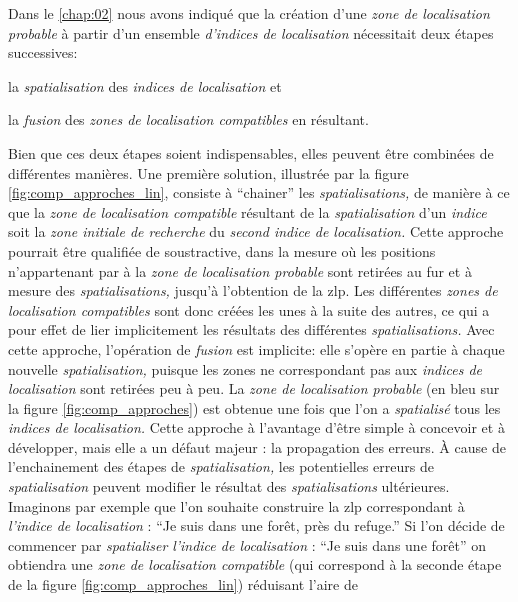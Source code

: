 Dans le \autoref{chap:02} nous avons indiqué que la création d'une
\emph{zone de localisation probable} à partir d'un ensemble
\emph{d'indices de localisation} nécessitait deux étapes successives:
% 
\begin{enumerate*}[label=(\alph*)]
\item la \emph{spatialisation} des \emph{indices de localisation} et
\item la \emph{fusion} des \emph{zones de localisation compatibles} en
résultant.
\end{enumerate*}
% 
Bien que ces deux étapes soient indispensables, elles peuvent être
combinées de différentes manières. Une première solution, illustrée
par la figure \ref{fig:comp_approches_lin}, consiste à
\enquote{chainer} les \emph{spatialisations,} de manière à ce que la
\emph{zone de localisation compatible} résultant de la
\emph{spatialisation} d'un \emph{indice} soit la \emph{zone initiale
  de recherche} du \emph{second indice de localisation.} Cette
approche pourrait être qualifiée de soustractive, dans la mesure où
les positions n'appartenant par à la \emph{zone de localisation
  probable} sont retirées au fur et à mesure des
\emph{spatialisations,} jusqu'à l'obtention de la \ac{zlp}. Les
différentes \emph{zones de localisation compatibles} sont donc créées
les unes à la suite des autres, ce qui a pour effet de lier
implicitement les résultats des différentes \emph{spatialisations.}
Avec cette approche, l'opération de \emph{fusion} est implicite: elle
s'opère en partie à chaque nouvelle \emph{spatialisation,} puisque les
zones ne correspondant pas aux \emph{indices de localisation} sont
retirées peu à peu. La \emph{zone de localisation probable} (en bleu
sur la figure \ref{fig:comp_approches}) est obtenue une fois que l'on
a \emph{spatialisé} tous les \emph{indices de localisation.} Cette
approche à l'avantage d'être simple à concevoir et à développer, mais
elle a un défaut majeur : la propagation des erreurs. À cause de
l'enchainement des étapes de \emph{spatialisation,} les potentielles
erreurs de \emph{spatialisation} peuvent modifier le résultat des
\emph{spatialisations} ultérieures. Imaginons par exemple que l'on
souhaite construire la \ac{zlp} correspondant à \emph{l'indice de
  localisation} : \enquote{Je suis dans une forêt, près du refuge.} Si
l'on décide de commencer par \emph{spatialiser} \emph{l'indice de
  localisation} : \enquote{Je suis dans une forêt} on obtiendra une
\emph{zone de localisation compatible} (qui correspond à la seconde
étape de la figure \ref{fig:comp_approches_lin}) réduisant l'aire de
